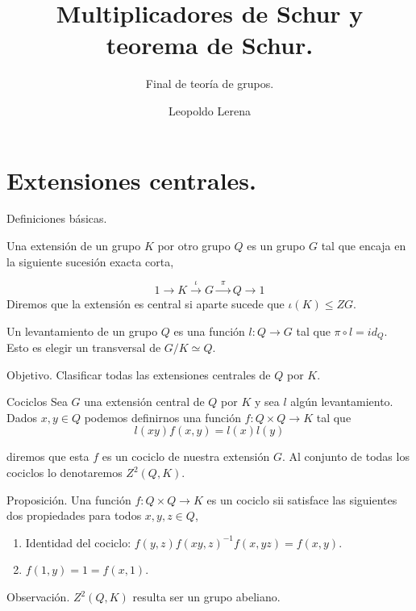 \documentclass[aspectratio=169, 9pt]{beamer}
\title{Multiplicadores de Schur y teorema de Schur.}
\subtitle{Final de teoría de grupos.}
\date{}
\author{Leopoldo Lerena}
\institute{Universidad de Buenos Aires}
\begin{document}
\maketitle


\section[Extensiones centrales]{Extensiones centrales.}

\begin{frame}[fragile]{Definiciones básicas.}



\bigskip

Una \alert{extensión} de un grupo $K$ por otro grupo $Q$ es un grupo $G$ tal que encaja en la siguiente sucesión exacta corta,

\begin{equation*}
    1\longrightarrow K\xrightarrow{\phantom{a}\iota\phantom{a}}G\xrightarrow{\phantom{a}\pi\phantom{a}}Q\longrightarrow 1
\end{equation*}
\pause
Diremos que la extensión es \alert{central} si aparte sucede que $\iota(K) \le ZG$.

\medskip

Un \alert{levantamiento} de un grupo $Q$ es una función $l:Q \to G$ tal que $\pi \circ l = id_Q$. Esto es elegir un transversal de $G/K \simeq Q$.
\pause
\bigskip
\begin{alertblock}{Objetivo.}
Clasificar todas las extensiones centrales de $Q$ por $K$.
\end{alertblock}
\end{frame}

\begin{frame}[fragile]{Cociclos}
Sea $G$ una extensión central de $Q$ por $K$ y sea $l$ algún levantamiento. Dados $x,y \in Q$ podemos definirnos una función $f:Q \times Q \to K$ tal que 
\begin{equation*}
l(xy) f(x,y) = l(x)l(y)    
\end{equation*} 

diremos que esta $f$ es un \alert{cociclo} de nuestra extensión $G$. Al conjunto de todas los cociclos lo denotaremos $Z^2(Q,K)$.
\medskip
\pause
{}
\begin{alertblock}{Proposición.}
	Una función $f:Q \times Q \to K$ es un cociclo sii satisface las siguientes dos propiedades para todos $x,y,z \in Q$,
	\begin{enumerate}
		\item \alert{Identidad del cociclo}: $f(y,z)f(xy,z)^{-1}f(x,yz) = f(x,y)$.
		\item $f(1,y)=1=f(x,1)$. 
	\end{enumerate}
\end{alertblock}
\pause
\begin{exampleblock}{Observación.}
 $Z^2(Q,K)$ resulta ser un grupo abeliano.
\end{exampleblock}
\end{frame}
\end{document}
